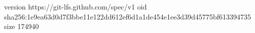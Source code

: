 version https://git-lfs.github.com/spec/v1
oid sha256:1e9ea63d0d7f3bbe11e122dd612ef6d1a1de454e1ee3d39d45775bf613394735
size 174940
